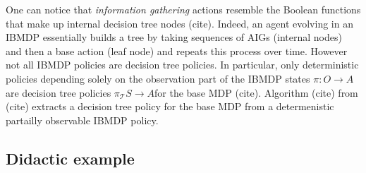 One can notice that \textit{information gathering} actions resemble the Boolean functions that make up internal decision tree nodes (cite). 
Indeed, an agent evolving in an IBMDP essentially builds a tree by taking sequences of AIGs (internal nodes) and then a base action (leaf node) and repeats this process over time.
However not all IBMDP policies are decision tree policies. In particular, only deterministic policies depending solely on the observation part of the IBMDP states $\pi: O \rightarrow A$ are decision tree policies $\pi_{\mathcal{T}} S \rightarrow A$for the base MDP (cite).
Algorithm (cite) from (cite) extracts a decision tree policy for the base MDP from a determenistic partailly observable IBMDP policy.

\subsection{Didactic example}
